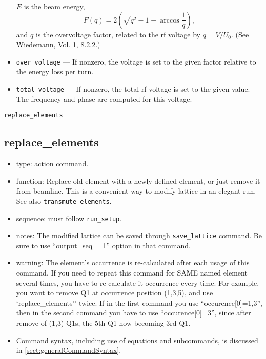 \documentclass[11pt]{article}
\begin{document}
\begin{itemize}
$E$ is the beam energy, 
\begin{equation}
F(q) = 2 \left(\sqrt{q^2-1} - \arccos \frac{1}{q}\right),
\end{equation}
and $q$ is the overvoltage factor, related to the rf voltage by $q = V/U_0$. (See Wiedemann, Vol. 1, 8.2.2.)
\item \verb|over_voltage| --- If nonzero, the voltage is set to the given factor relative to the 
energy loss per turn.
\item \verb|total_voltage| --- If nonzero, the total rf voltage is set to the given value. The frequency and
  phase are computed for this voltage.
\end{itemize}

\newpage
\begin{center}{\Large\verb|replace_elements|}\end{center}
\subsection{replace\_elements \label{subsec:replaceelements}}

\begin{itemize}
\item type: action command.
\item function: Replace old element with a newly defined element, or just 
   remove it from beamline. This is a convenient way to modify lattice in an elegant run.
   See also \verb|transmute_elements|.
\item sequence: must follow \verb|run_setup|.
\item notes: 
	The modified lattice can be saved through \verb|save_lattice|
   command. Be sure to use ``output\_seq = 1'' option in that command.  
\item warning:
   The element's occurrence is re-calculated after each usage of this command. If 
   you need to repeat this command for SAME named element several times, you have to re-calculate 
   it occurrence every time. For example, you want to remove Q1 at occurrence position 
   (1,3,5), and use 
   `replace\_elements'' twice. If in the first command you use ``occurence[0]=1,3'',
   then in the second command you have to use ``occurence[0]=3'', since after remove of
   (1,3) Q1s, the 5th Q1 now becoming 3rd Q1.
\item Command syntax, including use of equations and subcommands, is discussed in \ref{sect:generalCommandSyntax}.
\end{itemize}
\end{document}
